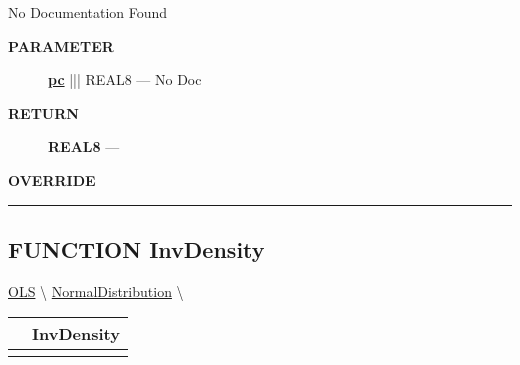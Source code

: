 \par





No Documentation Found






\par
\begin{description}
\item [\colorbox{tagtype}{\color{white} \textbf{\textsf{PARAMETER}}}] \textbf{\underline{pc}} ||| REAL8 --- No Doc
\end{description}







\par
\begin{description}
\item [\colorbox{tagtype}{\color{white} \textbf{\textsf{RETURN}}}] \textbf{REAL8} --- 
\end{description}






\par
\begin{description}
\item [\colorbox{tagtype}{\color{white} \textbf{\textsf{OVERRIDE}}}] 
\end{description}



\rule{\linewidth}{0.5pt}
\subsection*{\textsf{\colorbox{headtoc}{\color{white} FUNCTION}
InvDensity}}

\hypertarget{ecldoc:linearregression.ols.distributionbase.invdensity}{}
\hspace{0pt} \hyperlink{ecldoc:linearregression.ols}{OLS} \textbackslash 
\hspace{0pt} \hyperlink{ecldoc:linearregression.ols.normaldistribution}{NormalDistribution} \textbackslash 

{\renewcommand{\arraystretch}{1.5}
\begin{tabularx}{\textwidth}{|>{\raggedright\arraybackslash}l|X|}
\hline
\hspace{0pt}\mytexttt{\color{red} } & \textbf{InvDensity} \\
\hline
\multicolumn{2}{|>{\raggedright\arraybackslash}X|}{\hspace{0pt}\mytexttt{\color{param} (t\_FieldReal delta)}} \\
\hline
\end{tabularx}
}

